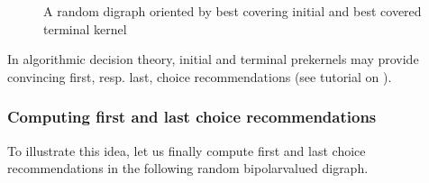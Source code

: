 \documentclass[a4paper,12pt,english]{sphinxhowto}
\let\sphinxpxdimen\pdfpxdimen\else\newdimen\sphinxpxdimen
\begin{document}
\begin{sphinxVerbatim}[commandchars=\\\{\},numbers=left,firstnumber=1,stepnumber=1]
                  \PYG{p}{[} \PYG{p}{]}
                  \PYG{p}{[} \PYG{p}{]}
\end{sphinxVerbatim}

\begin{figure}[H]
\centering
\capstart

\noindent\sphinxincludegraphics[width=300\sphinxpxdimen]{{orientedLaterality}.png}
\caption{A random digraph oriented by best covering initial and
best covered terminal kernel}\label{\detokenize{pearls:orientedlaterality}}\end{figure}

\sphinxAtStartPar
In algorithmic decision theory, initial and terminal prekernels may provide convincing first, resp. last, choice recommendations (see tutorial on ).


\subsubsection{Computing first and last choice recommendations}
\label{\detokenize{pearls:computing-first-and-last-choice-recommendations}}
\sphinxAtStartPar
To illustrate this idea, let us finally compute first and last choice recommendations in the following random bipolar\sphinxhyphen{}valued  digraph.
\end{document}
